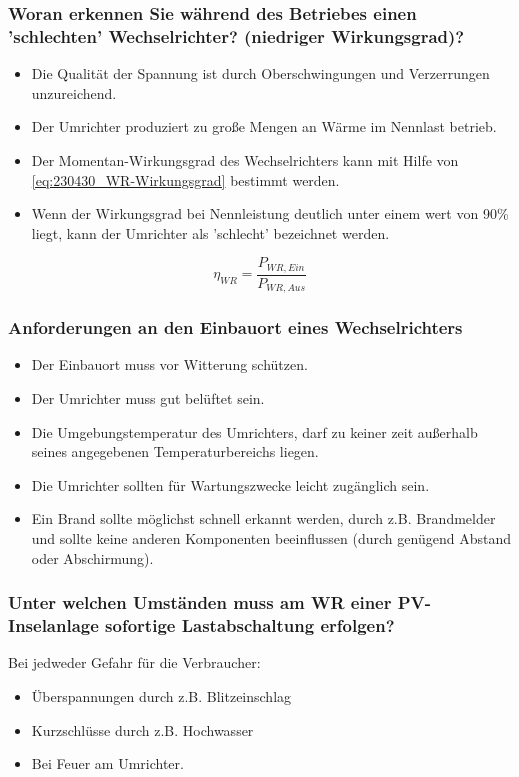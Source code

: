 \subsubsection{Woran erkennen Sie während des Betriebes einen 'schlechten' Wechselrichter? (niedriger Wirkungsgrad)?}

\begin{itemize}
    \item Die Qualität der Spannung ist durch Oberschwingungen und Verzerrungen unzureichend.
    \item Der Umrichter produziert zu große Mengen an Wärme im Nennlast betrieb.
    \item Der Momentan-Wirkungsgrad des Wechselrichters kann mit Hilfe von \autoref{eq:230430_WR-Wirkungsgrad} bestimmt werden.
    \item Wenn der Wirkungsgrad bei Nennleistung deutlich unter einem wert von 90\% liegt, kann der Umrichter als 'schlecht' bezeichnet werden.
\end{itemize}

\begin{equation}
    \eta_{WR} = \frac{P_{WR,Ein}}{P_{WR,Aus}}
    \label{eq:230430_WR-Wirkungsgrad}
\end{equation}

\subsubsection{Anforderungen an den Einbauort eines Wechselrichters}
\begin{itemize}
    \item Der Einbauort muss vor Witterung schützen.
    \item Der Umrichter muss gut belüftet sein.
    \item Die Umgebungstemperatur des Umrichters, darf zu keiner zeit außerhalb seines angegebenen Temperaturbereichs liegen.
    \item Die Umrichter sollten für Wartungszwecke leicht zugänglich sein.
    \item Ein Brand sollte möglichst schnell erkannt werden, durch z.B. Brandmelder und sollte keine anderen Komponenten beeinflussen (durch genügend Abstand oder Abschirmung).
\end{itemize}
\subsubsection{Unter welchen Umständen muss am WR einer PV-Inselanlage sofortige Lastabschaltung erfolgen?}
Bei jedweder Gefahr für die Verbraucher:
\begin{itemize}
    \item Überspannungen durch z.B. Blitzeinschlag
    \item Kurzschlüsse durch z.B. Hochwasser
    \item Bei Feuer am Umrichter.
\end{itemize}
